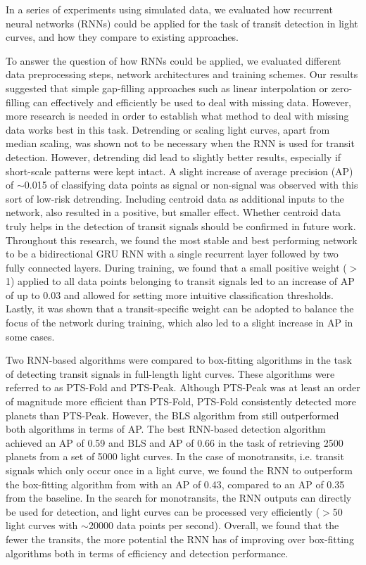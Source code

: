 
In a series of experiments using simulated data, we evaluated how recurrent neural networks (RNNs) could be applied for the task of transit detection in light curves, and how they compare to existing approaches. 

To answer the question of how RNNs could be applied, we evaluated different data preprocessing steps, network architectures and training schemes. Our results suggested that simple gap-filling approaches such as linear interpolation or zero-filling can effectively and efficiently be used to deal with missing data. However, more research is needed in order to establish what method to deal with missing data works best in this task. Detrending or scaling light curves, apart from median scaling, was shown not to be necessary when the RNN is used for transit detection. However, detrending did lead to slightly better results, especially if short-scale patterns were kept intact. A slight increase of average precision (AP) of $\sim$0.015 of classifying data points as signal or non-signal was observed with this sort of low-risk detrending. Including centroid data as additional inputs to the network, also resulted in a positive, but smaller effect. Whether centroid data truly helps in the detection of transit signals should be confirmed in future work. Throughout this research, we found the most stable and best performing network to be a bidirectional GRU RNN with a single recurrent layer followed by two fully connected layers.  During training, we found that a small positive weight ($>$1) applied to all data points belonging to transit signals led to an increase of AP of up to 0.03 and allowed for setting more intuitive classification thresholds. Lastly, it was shown that a transit-specific weight can be adopted to balance the focus of the network during training, which also led to a slight increase in AP in some cases.

Two RNN-based algorithms were compared to box-fitting algorithms in the task of detecting transit signals in full-length light curves. These algorithms were referred to as PTS-Fold and PTS-Peak. Although PTS-Peak was at least an order of magnitude more efficient than PTS-Fold, PTS-Fold consistently detected more planets than PTS-Peak. However, the BLS algorithm from \cite{kovacs2002box} still outperformed both algorithms in terms of AP. The best RNN-based detection algorithm achieved an AP of 0.59 and BLS and AP of 0.66 in the task of retrieving 2500 planets from a set of 5000 light curves.  In the case of monotransits, i.e. transit signals which only occur once in a light curve, we found the RNN to outperform the box-fitting algorithm from \cite{foreman2016population} with an AP of 0.43, compared to an AP of 0.35 from the baseline. In the search for monotransits, the RNN outputs can directly be used for detection, and light curves can be processed very efficiently ($>$50 light curves with $\sim$20000 data points per second). Overall, we found that the fewer the transits, the more potential the RNN has of improving over box-fitting algorithms both in terms of efficiency and detection performance.

